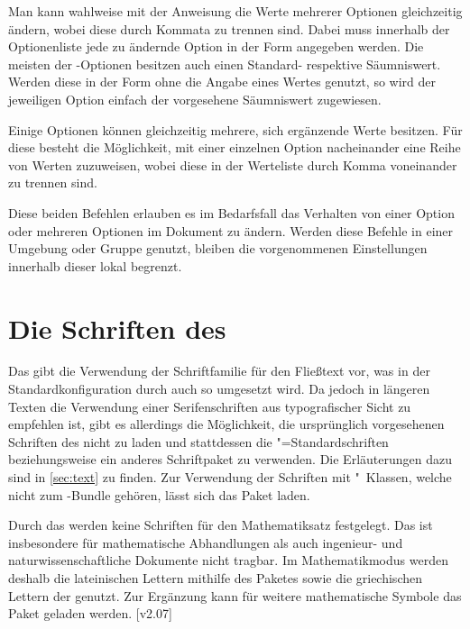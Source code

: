 \begin{DeclareEntity*}{}
\begin{DeclareEntity*}{}
\begin{DeclareEntity*}{}
\begin{Declaration}
\begin{Declaration}
Man kann wahlweise mit der Anweisung  die Werte mehrerer 
Optionen gleichzeitig ändern, wobei diese durch Kommata zu trennen sind. Dabei 
muss innerhalb der Optionenliste jede zu ändernde Option in der Form 
\PValue{=} angegeben werden. Die meisten der 
\TUDScript-Optionen besitzen auch einen Standard- respektive Säumniswert. 
Werden diese in der Form  ohne die Angabe eines Wertes genutzt, 
so wird der jeweiligen Option einfach der vorgesehene Säumniswert zugewiesen.

Einige Optionen können gleichzeitig mehrere, sich ergänzende Werte besitzen. 
Für diese besteht die Möglichkeit, mit  einer einzelnen Option 
nacheinander eine Reihe von Werten zuzuweisen, wobei diese in der Werteliste 
durch Komma voneinander zu trennen sind.

Diese beiden Befehlen erlauben es im Bedarfsfall das Verhalten von einer Option 
oder mehreren Optionen im Dokument zu ändern. Werden diese Befehle in einer 
Umgebung oder Gruppe genutzt, bleiben die vorgenommenen Einstellungen innerhalb 
dieser lokal begrenzt.
\end{Declaration}
\end{Declaration}



\section{%
  Die Schriften des \CDs%
  \label{sec:fonts}%
}
%
Das \TUDCD gibt die Verwendung der Schriftfamilie \OpenSans für den Fließtext 
vor, was in der Standardkonfiguration durch \TUDScript auch so umgesetzt wird. 
Da jedoch in längeren Texten die Verwendung einer Serifenschriften aus 
typografischer Sicht zu empfehlen ist, gibt es allerdings die Möglichkeit, die 
ursprünglich vorgesehenen Schriften des \CDs nicht zu laden und stattdessen die 
"=Standardschriften beziehungsweise ein anderes Schriftpaket zu 
verwenden. Die Erläuterungen dazu sind in \autoref{sec:text} zu finden. Zur 
Verwendung der Schriften mit "~Klassen, welche nicht zum 
\TUDScript-Bundle gehören, lässt sich das Paket  laden.

%
Durch das \CD werden keine Schriften für den Mathematiksatz festgelegt. Das ist 
insbesondere für mathematische Abhandlungen als auch ingenieur- und 
naturwissenschaftliche Dokumente nicht tragbar. Im Mathematikmodus werden 
deshalb die lateinischen Lettern mithilfe des Paketes 
sowie die griechischen Lettern der \OpenSans genutzt. Zur Ergänzung kann für 
weitere mathematische Symbole das Paket  geladen werden.
[v2.07]


\end{DeclareEntity*}
\end{DeclareEntity*}
\end{DeclareEntity*}

